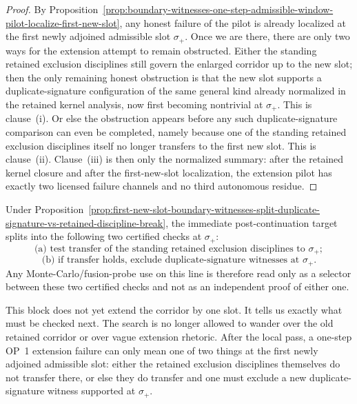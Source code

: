 \begin{proof}
By Proposition~\ref{prop:boundary-witnesses-one-step-admissible-window-pilot-localize-first-new-slot}, any honest failure of the pilot is already localized at the first newly adjoined admissible slot $\sigma_{+}$. Once we are there, there are only two ways for the extension attempt to remain obstructed. Either the standing retained exclusion disciplines still govern the enlarged corridor up to the new slot; then the only remaining honest obstruction is that the new slot supports a duplicate-signature configuration of the same general kind already normalized in the retained kernel analysis, now first becoming nontrivial at $\sigma_{+}$. This is clause~(i). Or else the obstruction appears before any such duplicate-signature comparison can even be completed, namely because one of the standing retained exclusion disciplines itself no longer transfers to the first new slot. This is clause~(ii). Clause~(iii) is then only the normalized summary: after the retained kernel closure and after the first-new-slot localization, the extension pilot has exactly two licensed failure channels and no third autonomous residue.
\end{proof}

\begin{corollary}
\label{cor:immediate-post-r14-continuation-target-one-step-op1-extension-pilot}
Under Proposition~\ref{prop:first-new-slot-boundary-witnesses-split-duplicate-signature-vs-retained-discipline-break}, the immediate post-continuation target splits into the following two certified checks at $\sigma_{+}$:
\[
\text{(a) test transfer of the standing retained exclusion disciplines to } \sigma_{+};
\]
\[
\text{(b) if transfer holds, exclude duplicate-signature witnesses at } \sigma_{+}.
\]
Any Monte-Carlo/fusion-probe use on this line is therefore read only as a selector between these two certified checks and not as an independent proof of either one.
\end{corollary}

\begin{remark}
\label{rem:what-first-channel-split-at-new-slot-buys}
This block does not yet extend the corridor by one slot. It tells us exactly what must be checked next. The search is no longer allowed to wander over the old retained corridor or over vague extension rhetoric. After the local pass, a one-step OP~1 extension failure can only mean one of two things at the first newly adjoined admissible slot: either the retained exclusion disciplines themselves do not transfer there, or else they do transfer and one must exclude a new duplicate-signature witness supported at $\sigma_{+}$.
\end{remark}





